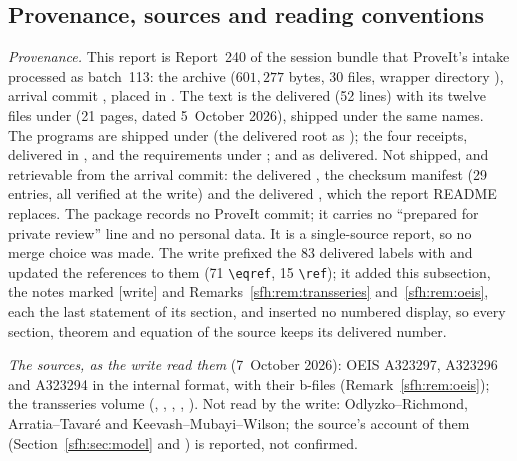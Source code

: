 \subsection{Provenance, sources and reading conventions}\label{sfh:sec:provenance}
\begin{writenote}\raggedright
\emph{Provenance.} This report is Report~240 of the session bundle that
ProveIt's  intake processed as batch~113: the archive
 ($601{,}277$ bytes, 30 files, wrapper directory
), arrival commit , placed in
. The text is the delivered  (52 lines)
with its twelve \verb|| files under  (21 pages, dated
5~October 2026), shipped under the same names. The programs are shipped under
 (the delivered root  as ); the
four receipts, delivered in , and the requirements under
;  and  as delivered. Not
shipped, and retrievable from the arrival commit: the delivered
, the checksum manifest  (29
entries, all verified at the write) and the delivered , which
the report README replaces. The package records no ProveIt commit; it carries
no ``prepared for private review'' line and no personal data. It is a
single-source report, so no merge choice was made. The write prefixed the
83 delivered labels with  and updated the references to them
(71 \verb|\eqref|, 15 \verb|\ref|); it added this subsection, the notes marked [write] and
Remarks~\ref{sfh:rem:transseries} and~\ref{sfh:rem:oeis}, each the last
statement of its section, and inserted no numbered display, so every section,
theorem and equation of the source keeps its delivered number.

\emph{The sources, as the write read them} (7~October 2026): OEIS A323297,
A323296 and A323294 in the internal format, with their b-files
(Remark~\ref{sfh:rem:oeis}); the transseries volume
(, , ,
, ). Not read by
the write: Odlyzko--Richmond, Arratia--Tavar\'e and Keevash--Mubayi--Wilson;
the source's account of them (Section~\ref{sfh:sec:model} and
) is reported, not confirmed.


\end{writenote}
